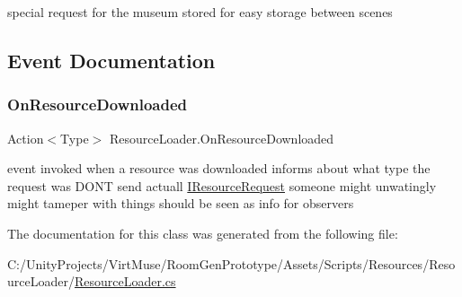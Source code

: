 special request for the museum stored for easy storage between scenes 



\subsection{Event Documentation}
\mbox{\label{class_resource_loader_a81acd4bfcfed997a7a339d90383a2a26}} 
\subsubsection{\texorpdfstring{On\+Resource\+Downloaded}{OnResourceDownloaded}}
{\footnotesize\ttfamily Action$<$Type$>$ Resource\+Loader.\+On\+Resource\+Downloaded}



event invoked when a resource was downloaded informs about what type the request was D\+O\+NT send actuall \mbox{\hyperlink{interface_i_resource_request}{I\+Resource\+Request}} someone might unwatingly might tameper with things should be seen as info for observers 



The documentation for this class was generated from the following file\+:\begin{DoxyCompactItemize}
\item 
C\+:/\+Unity\+Projects/\+Virt\+Muse/\+Room\+Gen\+Prototype/\+Assets/\+Scripts/\+Resources/\+Resource\+Loader/\mbox{\hyperlink{_resource_loader_8cs}{Resource\+Loader.\+cs}}\end{DoxyCompactItemize}
